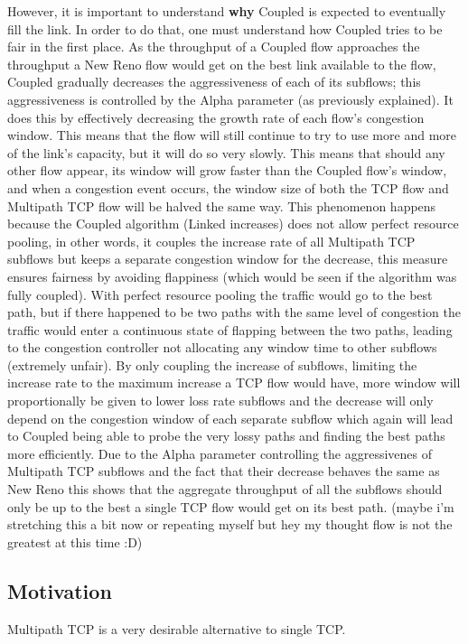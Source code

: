 However, it is important to understand \textbf{why} Coupled is expected to 
eventually fill the link. In order to do that, one must understand how Coupled 
tries to be fair in the first place. As the throughput of a Coupled flow 
approaches the throughput a New Reno flow would get on the best link available 
to the flow, Coupled gradually decreases the aggressiveness of each of its 
subflows; this aggressiveness is controlled by the Alpha parameter (as 
previously explained). It does this by effectively decreasing the growth rate of 
each flow's congestion window. This means that the flow will still continue to 
try to use more and more of the link's capacity, but it will do so very slowly. 
This means that should any other flow appear, its window will grow faster than 
the Coupled flow's window, and when a congestion event occurs, the window size 
of both the TCP flow and Multipath TCP flow will be halved the same way. This 
phenomenon happens because the Coupled algorithm (Linked increases) does not 
allow perfect resource pooling, in other words, it couples the increase rate of 
all Multipath TCP subflows but keeps a separate congestion window for the 
decrease, this measure ensures fairness by avoiding flappiness (which would be 
seen if the algorithm was fully coupled). With perfect resource pooling the 
traffic would go to the best path, but if there happened to be two paths with 
the same level of congestion the traffic would enter a continuous state of 
flapping between the two paths, leading to the congestion controller not 
allocating any window time to other subflows (extremely unfair). By only 
coupling the increase of subflows, limiting the increase rate to the maximum 
increase a TCP flow would have, more window will proportionally be given to 
lower loss rate subflows and the decrease will only depend on the congestion 
window of each separate subflow which again will lead to Coupled being able to 
probe the very lossy paths and finding the best paths more efficiently. 
Due to the Alpha parameter controlling the aggressivenes of Multipath TCP 
subflows and the fact that their decrease behaves the same as New Reno this 
shows that the aggregate throughput of all the subflows should only be up to the 
best a single TCP flow would get on its best path. (maybe i'm stretching this a 
bit now or repeating myself but hey my thought flow is not the greatest at this 
time :D)  %

\subsection{Motivation}
Multipath TCP is a very desirable alternative to single TCP.

